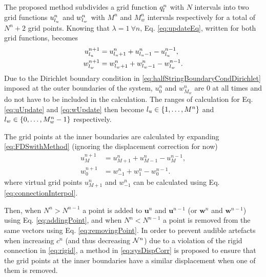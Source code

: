 The proposed method subdivides a grid function $q_l^n$ with $N$ intervals into two grid functions $u_{l_u}^n$ and $w_{l_w}^n$ with $M^n$ and $M_w^n$ intervals respectively for a total of $N^n+2$ grid points. Knowing that $\lambda=1 \ \forall n$, Eq. \eqref{eq:updateEq}, written for both grid functions, becomes 
\begin{subequations}\label{eq:uwUpdates}
    \begin{align}
        u_{l_u}^{n+1} &= u_{{l_u}+1}^n + u_{{l_u}-1}^n - u_{l_u}^{n-1},\label{eq:uUpdate}\\
        w_{l_w}^{n+1} &= w_{{l_w}+1}^n + w_{{l_w}-1}^n - w_{l_w}^{n-1}\label{eq:wUpdate}.
    \end{align}
\end{subequations}
%
Due to the Dirichlet boundary condition in \eqref{eq:halfStringBoundaryCondDirichlet} imposed at the outer boundaries of the system, $u_0^n$ and $w_{M_w}^n$ are $0$ at all times and do not have to be included in the calculation. The ranges of calculation for Eq. \eqref{eq:uUpdate} and \eqref{eq:wUpdate} then become ${l_u} \in \{1, \hdots, M^n\}$ and ${l_w} \in \{0, \hdots, M_w^n - 1\}$ respectively. 

The grid points at the inner boundaries are calculated by expanding \eqref{eq:FDSwithMethod} (ignoring the displacement correction for now)
\begin{subequations}\label{eq:innerboundariesExpanded}
    \begin{align}
        u_M^{n+1} &= u_{M+1}^n + u_{M-1}^n - u_M^{n-1},\\
        w_0^{n+1} &= w_{-1}^n + w_{1}^n - w_0^{n-1}.
    \end{align}
\end{subequations}
%
where virtual grid points $u_{M+1}^n$ and $w_{-1}^n$ can be calculated using Eq. \eqref{eq:connectionInterpol}.

Then, when $ N^n > N^{n-1}$ a point is added to $\mathbf{u}^n$ and $\mathbf{u}^{n-1}$ (or $\mathbf{w}^n$ and $\mathbf{w}^{n-1}$) using Eq. \eqref{eq:addingPoint}, and when $ N^n  < N^{n-1}$ a point is removed from the same vectors using Eq. \eqref{eq:removingPoint}. In order to prevent audible artefacts when increasing $c^n$ (and thus decreasing $\mathcal{N}^n$) due to a violation of the rigid connection in \eqref{eq:rigid}, a method in \eqref{eq:sysDispCorr} is proposed to ensure that the grid points at the inner boundaries have a similar displacement when one of them is removed. 


